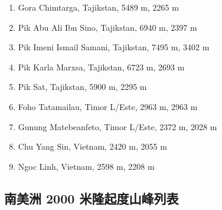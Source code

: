 \documentclass[10pt,twocolumn,letterpaper]{article}
\begin{document}
\begin{flushleft}
\begin{enumerate}
    \item Gora Chimtarga, Tajikstan, 5489 m, 2265 m
    \item Pik Abu Ali Ibn Sino, Tajikstan, 6940 m, 2397 m
    \item Pik Imeni Ismail Samani, Tajikstan, 7495 m, 3402 m
    \item Pik Karla Marxsa, Tajikstan, 6723 m, 2693 m
    \item Pik Sat, Tajikstan, 5900 m, 2295 m
    \item Foho Tatamailau, Timor L/Este, 2963 m, 2963 m
    \item Gunung Matebeanfeto, Timor L/Este, 2372 m, 2028 m
    \item Chu Yang Sin, Vietnam, 2420 m, 2055 m
    \item Ngoc Linh, Vietnam, 2598 m, 2208 m
\end{enumerate}
\end{flushleft}

\subsection{南美洲 2000 米隆起度山峰列表}
\end{document}
